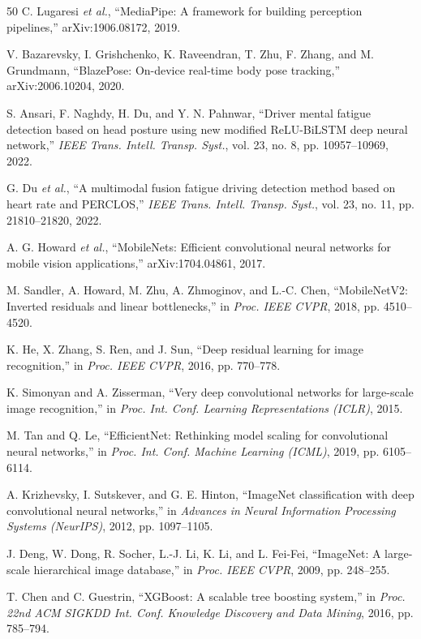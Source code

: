 \documentclass[conference]{IEEEtran}
\begin{document}
\begin{thebibliography}{50}
C. Lugaresi \emph{et al.}, ``MediaPipe: A framework for building perception pipelines,'' arXiv:1906.08172, 2019.

V. Bazarevsky, I. Grishchenko, K. Raveendran, T. Zhu, F. Zhang, and M. Grundmann, ``BlazePose: On-device real-time body pose tracking,'' arXiv:2006.10204, 2020.

S. Ansari, F. Naghdy, H. Du, and Y. N. Pahnwar, ``Driver mental fatigue detection based on head posture using new modified ReLU-BiLSTM deep neural network,'' \emph{IEEE Trans. Intell. Transp. Syst.}, vol. 23, no. 8, pp. 10957--10969, 2022.

G. Du \emph{et al.}, ``A multimodal fusion fatigue driving detection method based on heart rate and PERCLOS,'' \emph{IEEE Trans. Intell. Transp. Syst.}, vol. 23, no. 11, pp. 21810--21820, 2022.

A. G. Howard \emph{et al.}, ``MobileNets: Efficient convolutional neural networks for mobile vision applications,'' arXiv:1704.04861, 2017.

M. Sandler, A. Howard, M. Zhu, A. Zhmoginov, and L.-C. Chen, ``MobileNetV2: Inverted residuals and linear bottlenecks,'' in \emph{Proc. IEEE CVPR}, 2018, pp. 4510--4520.

K. He, X. Zhang, S. Ren, and J. Sun, ``Deep residual learning for image recognition,'' in \emph{Proc. IEEE CVPR}, 2016, pp. 770--778.

K. Simonyan and A. Zisserman, ``Very deep convolutional networks for large-scale image recognition,'' in \emph{Proc. Int. Conf. Learning Representations (ICLR)}, 2015.

M. Tan and Q. Le, ``EfficientNet: Rethinking model scaling for convolutional neural networks,'' in \emph{Proc. Int. Conf. Machine Learning (ICML)}, 2019, pp. 6105--6114.

A. Krizhevsky, I. Sutskever, and G. E. Hinton, ``ImageNet classification with deep convolutional neural networks,'' in \emph{Advances in Neural Information Processing Systems (NeurIPS)}, 2012, pp. 1097--1105.

J. Deng, W. Dong, R. Socher, L.-J. Li, K. Li, and L. Fei-Fei, ``ImageNet: A large-scale hierarchical image database,'' in \emph{Proc. IEEE CVPR}, 2009, pp. 248--255.

T. Chen and C. Guestrin, ``XGBoost: A scalable tree boosting system,'' in \emph{Proc. 22nd ACM SIGKDD Int. Conf. Knowledge Discovery and Data Mining}, 2016, pp. 785--794.


\end{thebibliography}
\end{document}
